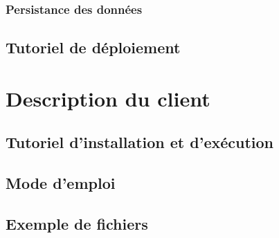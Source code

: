 \documentclass{article}
\begin{document}
\subsubsection{Persistance des données}
\subsection{Tutoriel de déploiement}
\newpage

\section{ Description du client}
\subsection{Tutoriel d'installation et d’exécution}
\subsection{Mode d’emploi}
\subsection{Exemple de fichiers}
\end{document}
